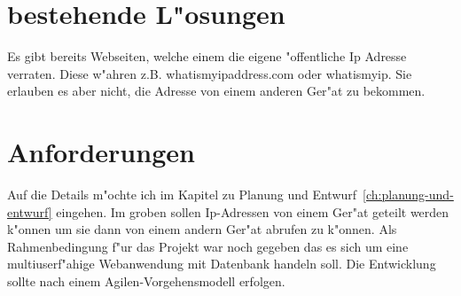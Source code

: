 \section{bestehende L{"o}sungen}\label{sec:bestehende-losungen}
Es gibt bereits Webseiten, welche einem die eigene {"o}ffentliche Ip Adresse verraten.
Diese w{"a}hren z.B. whatismyipaddress.com\cite{whatismyipaddress} oder whatismyip\cite{whatismyip}.
Sie erlauben es aber nicht, die Adresse von einem anderen Ger{"a}t zu bekommen.

\section{Anforderungen}\label{sec:anforderungen}
Auf die Details m{"o}chte ich im Kapitel zu Planung und Entwurf~\ref{ch:planung-und-entwurf} eingehen.
Im groben sollen Ip-Adressen von einem Ger{"a}t geteilt werden k{"o}nnen um sie dann von einem andern Ger{"a}t abrufen zu k{"o}nnen.
Als Rahmenbedingung f{"u}r das Projekt war noch gegeben das es sich um eine multiuserf{"a}hige Webanwendung mit Datenbank handeln soll.
Die Entwicklung sollte nach einem Agilen-Vorgehensmodell erfolgen.


